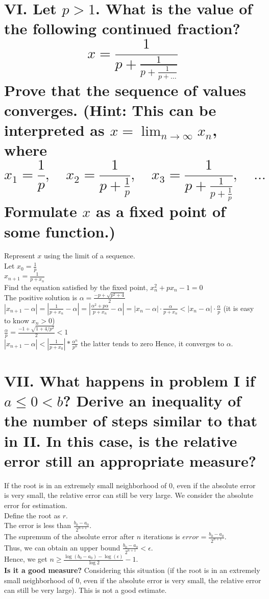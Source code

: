 \documentclass[a4paper]{article}
\begin{document}
\section*{VI. Let \( p > 1 \). What is the value of the following continued fraction?
\[
x = \frac{1}{p + \frac{1}{p + \frac{1}{p + \ldots}}}
\]
Prove that the sequence of values converges. (Hint: This can be interpreted as \( x = \lim_{n \to \infty} x_n \), where 
\[
x_1 = \frac{1}{p}, \quad x_2 = \frac{1}{p + \frac{1}{p}}, \quad x_3 = \frac{1}{p + \frac{1}{p + \frac{1}{p}}}, \quad \ldots
\]
Formulate \( x \) as a fixed point of some function.)}

Represent \( x \) using the limit of a sequence.\\
Let \( x_0 = \frac{1}{p} \)\\
\( x_{n+1} = \frac{1}{p + x_n} \)\\
Find the equation satisfied by the fixed point, \( x_n^2 + px_n - 1 = 0 \)\\
The positive solution is \( \alpha = \frac{-p + \sqrt{p^2 + 4}}{2} \)\\
\( |x_{n+1} - \alpha| = \left|\frac{1}{p + x_n} - \alpha\right| = \left|\frac{\alpha^2 + p\alpha}{p + x_n} - \alpha\right| = |x_n - \alpha| \cdot \frac{\alpha}{p + x_n} < |x_n - \alpha| \cdot \frac{\alpha}{p} \) (it is easy to know \( x_n > 0 \))\\
\( \frac{\alpha}{p} = \frac{-1 + \sqrt{1 + 4/p^2}}{2} < 1 \)\\
\( |x_{n+1} - \alpha| < |\frac{1}{p + x_0}|*\frac{\alpha^n}{p^n} \) the latter tends to zero
Hence, it converges to \( \alpha \).

\section*{VII. What happens in problem I if \( a \leq 0 < b \)? Derive an inequality of the number of steps similar to that in II. In this case, is the relative error still an appropriate measure?}

If the root is in an extremely small neighborhood of 0, even if the absolute error is very small, the relative error can still be very large.
We consider the absolute error for estimation.\\
Define the root as \( r \).\\
The error is less than \( \frac{b_0-a_0}{2^{n+1}} \).\\
The supremum of the absolute error after \( n \) iterations is \( error = \frac{b_0-a_0}{2^{n+1}} \).\\
Thus, we can obtain an upper bound \( \frac{b_0-a_0}{2^{n+1}} < \epsilon \).\\
Hence, we get \( n \geq \frac{\log(b_0-a_0) - \log(\epsilon)}{\log 2} - 1 \).\\
\textbf{Is it a good measure?}
Considering this situation (if the root is in an extremely small neighborhood of 0, even if the absolute error is very small, the relative error can still be very large).
This is not a good estimate.
\end{document}
